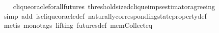 \begin{isabellebody}
%
\isadelimproof
\ \ %
\endisadelimproof
%
\isatagproof
{}\isamarkupfalse%
\ clique{\isacharunderscore}oracle{\isacharunderscore}for{\isacharunderscore}all{\isacharunderscore}futures\ threshold{\isacharunderscore}sized{\isacharunderscore}clique{\isacharunderscore}imps{\isacharunderscore}estimator{\isacharunderscore}agreeing\isanewline
\ \ \isamarkupfalse%
\ {\isacharparenleft}simp\ add{\isacharcolon}\ is{\isacharunderscore}clique{\isacharunderscore}oracle{\isacharunderscore}def\ naturally{\isacharunderscore}corresponding{\isacharunderscore}state{\isacharunderscore}property{\isacharunderscore}def{\isacharparenright}\isanewline
\ \ \isamarkupfalse%
\ {\isacharparenleft}metis\ {\isacharparenleft}mono{\isacharunderscore}tags{\isacharcomma}\ lifting{\isacharparenright}\ futures{\isacharunderscore}def\ mem{\isacharunderscore}Collect{\isacharunderscore}eq{\isacharparenright}%
\endisatagproof
{\isafoldproof}%
%
\isadelimproof
\isanewline
%
\endisadelimproof
%
\isadelimtheory
\ \ \isanewline
%
\endisadelimtheory
%
\isatagtheory
{}\isamarkupfalse%
%
\endisatagtheory
{\isafoldtheory}%
%
\isadelimtheory
%
\endisadelimtheory
%
\end{isabellebody}%
\endinput
